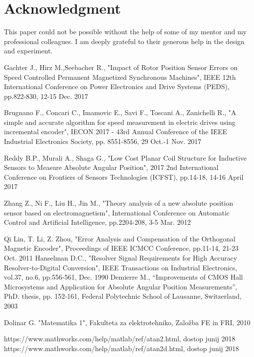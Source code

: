 \documentclass[a4paper]{article}
\begin{document}
\section*{Acknowledgment}
This paper could not be possible without the help of some of my mentor and my professional colleagues. I am deeply grateful to their generous help in the design and experiment.

\small
\begin{thebibliography}{1}
 Gachter J., Hirz M.,Seebacher R., "Impact of Rotor Position Sensor Errors on Speed
Controlled Permanent Magnetized Synchronous
Machines", IEEE 12th International Conference on Power Electronics and Drive Systems (PEDS), pp.822-830, 12-15 Dec. 2017

 Brugnano F., Concari C., Imamovic E., Savi F., Toscani  A., Zanichelli R., "A simple and accurate algorithm for speed measurement in electric drives using incremental encoder",
IECON 2017 - 43rd Annual Conference of the IEEE Industrial Electronics Society, pp. 8551-8556, 29 Oct.-1 Nov. 2017


 Reddy B.P., Murali A., Shaga G., "Low Cost Planar Coil Structure for Inductive Sensors to Measure Absolute Angular
Position", 2017 2nd International Conference on Frontiers of Sensors Technologies (ICFST), pp.14-18, 14-16 April 2017




 Zhang Z., Ni F., Liu H., Jin M., "Theory analysis of a new absolute position sensor based on electromagnetism", International Conference on Automatic Control and Artificial Intelligence, pp.2204-208, 3-5 Mar. 2012

	
	
 Qi Lin, T. Li, Z. Zhou, "Error Analysis and Compensation
of the Orthogonal Magnetic Encoder", Proceedings of IEEE ICMCC
Conference, pp.11-14, 21-23 Oct. 2011
 Hanselman D.C., "Resolver Signal Requirements for High Accuracy
Resolver-to-Digital Conversion", IEEE Transactions on Industrial
Electronics, vol.37, no.6, pp.556-561, Dec. 1990 
 Demierre M., “Improvements of CMOS Hall Microsystems and
Application for Absolute Angular Position Measurements”, PhD. thesis,
pp. 152-161, Federal Polytechnic School of Lausanne, Switzerland, 2003

 Dolinar G. "Matematika 1", Fakulteta za elektrotehniko, Založba FE in FRI, 2010

 https://www.mathworks.com/help/matlab/ref/atan2.html, dostop junij 2018
 https://www.mathworks.com/help/matlab/ref/atan2d.html, dostop junij 2018



\end{thebibliography}
\end{document}
